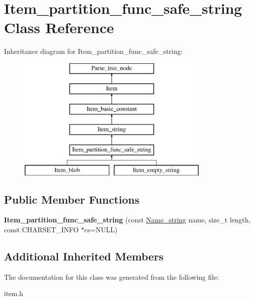 \hypertarget{classItem__partition__func__safe__string}{}\section{Item\+\_\+partition\+\_\+func\+\_\+safe\+\_\+string Class Reference}
\label{classItem__partition__func__safe__string}
Inheritance diagram for Item\+\_\+partition\+\_\+func\+\_\+safe\+\_\+string\+:\begin{figure}[H]
\begin{center}
\leavevmode
\includegraphics[height=6.000000cm]{classItem__partition__func__safe__string}
\end{center}
\end{figure}
\subsection*{Public Member Functions}
\begin{DoxyCompactItemize}
\item 
\mbox{\label{classItem__partition__func__safe__string_ae07beaede78ba3a1c6db4e0bb1e28e50}} 
{\bfseries Item\+\_\+partition\+\_\+func\+\_\+safe\+\_\+string} (const \mbox{\hyperlink{className__string}{Name\+\_\+string}} name, size\+\_\+t length, const C\+H\+A\+R\+S\+E\+T\+\_\+\+I\+N\+FO $\ast$cs=N\+U\+LL)
\end{DoxyCompactItemize}
\subsection*{Additional Inherited Members}


The documentation for this class was generated from the following file\+:\begin{DoxyCompactItemize}
\item 
item.\+h\end{DoxyCompactItemize}
